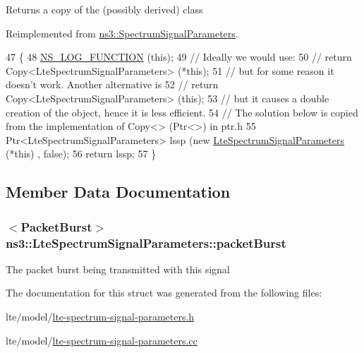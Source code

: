 \begin{DoxyReturn}{Returns}
a copy of the (possibly derived) class 
\end{DoxyReturn}


Reimplemented from \hyperlink{structns3_1_1SpectrumSignalParameters_a3404dea9df9e0fc4f47fa041bf68855c}{ns3\+::\+Spectrum\+Signal\+Parameters}.


\begin{DoxyCode}
47 \{
48   \hyperlink{log-macros-disabled_8h_a90b90d5bad1f39cb1b64923ea94c0761}{NS\_LOG\_FUNCTION} (\textcolor{keyword}{this});
49   \textcolor{comment}{// Ideally we would use:}
50   \textcolor{comment}{//   return Copy<LteSpectrumSignalParameters> (*this);}
51   \textcolor{comment}{// but for some reason it doesn't work. Another alternative is }
52   \textcolor{comment}{//   return Copy<LteSpectrumSignalParameters> (this);}
53   \textcolor{comment}{// but it causes a double creation of the object, hence it is less efficient.}
54   \textcolor{comment}{// The solution below is copied from the implementation of Copy<> (Ptr<>) in ptr.h}
55   Ptr<LteSpectrumSignalParameters> lssp (\textcolor{keyword}{new} \hyperlink{structns3_1_1LteSpectrumSignalParameters_a5638fc3b985cb1d27a4953903c515c9c}{LteSpectrumSignalParameters} (*\textcolor{keyword}{this})
      , \textcolor{keyword}{false});  
56   \textcolor{keywordflow}{return} lssp;
57 \}
\end{DoxyCode}


\subsection{Member Data Documentation}
\subsubsection[{\texorpdfstring{packet\+Burst}{packetBurst}}]{$<${\bf Packet\+Burst}$>$ ns3\+::\+Lte\+Spectrum\+Signal\+Parameters\+::packet\+Burst}\hypertarget{structns3_1_1LteSpectrumSignalParameters_a3c1712875f6139230ba68912ace57ae8}{}\label{structns3_1_1LteSpectrumSignalParameters_a3c1712875f6139230ba68912ace57ae8}
The packet burst being transmitted with this signal 

The documentation for this struct was generated from the following files\+:\begin{DoxyCompactItemize}
\item 
lte/model/\hyperlink{lte-spectrum-signal-parameters_8h}{lte-\/spectrum-\/signal-\/parameters.\+h}\item 
lte/model/\hyperlink{lte-spectrum-signal-parameters_8cc}{lte-\/spectrum-\/signal-\/parameters.\+cc}\end{DoxyCompactItemize}

